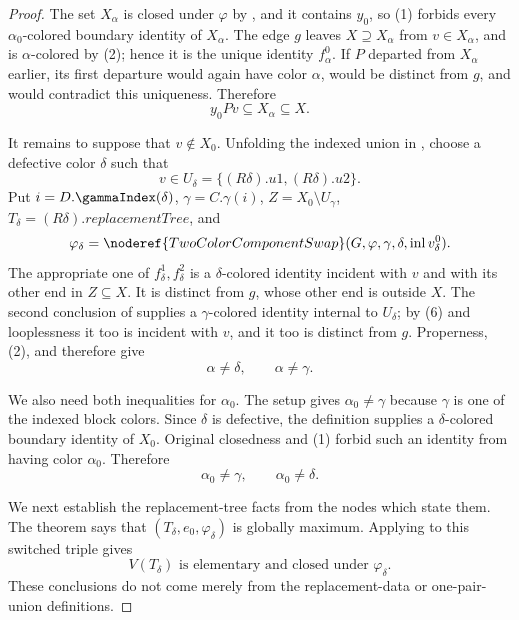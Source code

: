 \begin{proof}
The set $X_\alpha$ is closed under $\varphi$ by
, and it contains $y_0$, so (1)
forbids every $\alpha_0$-colored boundary identity of $X_\alpha$.
The edge $g$ leaves $X\supseteq X_\alpha$ from $v\in X_\alpha$, and is
$\alpha$-colored by (2); hence it is the unique identity
$f^0_\alpha$.  If $P$ departed from $X_\alpha$ earlier, its first
departure would again have color $\alpha$, would be distinct from $g$,
and would contradict this uniqueness.  Therefore
\[
 y_0Pv\subseteq X_\alpha\subseteq X.                         \tag{5}
\]

It remains to suppose that $v\notin X_0$.  Unfolding the indexed union in
, choose a defective color $\delta$
such that
\[
 v\in U_\delta=\{(R\delta).u1,(R\delta).u2\}.                \tag{6}
\]
Put $i=D.\gammaIndex(\delta)$, $\gamma=C.\gamma(i)$,
$Z=X_0\setminus U_\gamma$, $T_\delta=(R\delta).replacementTree$, and
\[
 \varphi_\delta=\noderef{TwoColorComponentSwap}
   (G,\varphi,\gamma,\delta,\operatorname{inl}v^0_\delta).
\]
The appropriate one of $f^1_\delta,f^2_\delta$ is a
$\delta$-colored identity incident with $v$ and with its other end in
$Z\subseteq X$.  It is distinct from $g$, whose other end is outside
$X$.  The second conclusion of
 supplies a
$\gamma$-colored identity internal to $U_\delta$; by (6) and
looplessness it too is incident with $v$, and it too is distinct from
$g$.  Properness, (2), and  therefore give
\[
 \alpha\ne\delta,\qquad \alpha\ne\gamma.                   \tag{7}
\]

We also need both inequalities for $\alpha_0$.  The setup gives
$\alpha_0\ne\gamma$ because $\gamma$ is one of the indexed block
colors.  Since $\delta$ is defective, the definition
 supplies a $\delta$-colored boundary identity
of $X_0$.  Original closedness and (1) forbid such an identity from
having color $\alpha_0$.  Therefore
\[
 \alpha_0\ne\gamma,\qquad \alpha_0\ne\delta.                \tag{8}
\]

We next establish the replacement-tree facts from the nodes which state
them.  The theorem  says that
$(T_\delta,e_0,\varphi_\delta)$ is globally maximum.  Applying
 to this switched triple gives
\[
 V(T_\delta)\text{ is elementary and closed under }\varphi_\delta.
                                                                    \tag{9}
\]
These conclusions do not come merely from the replacement-data or
one-pair-union definitions.


\end{proof}
